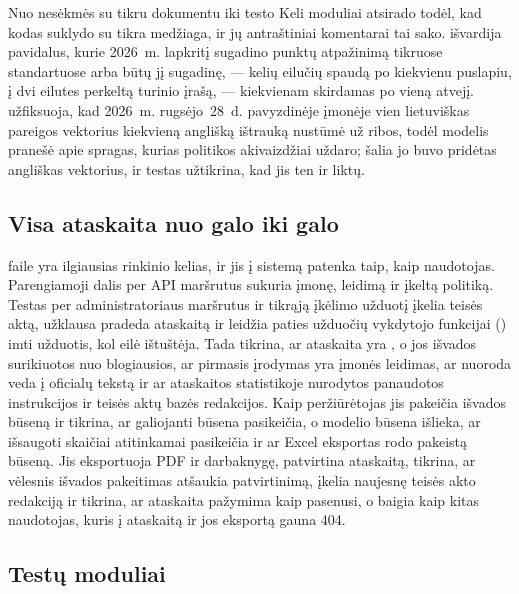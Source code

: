 \begin{lessonbox}{Nuo nesėkmės su tikru dokumentu iki testo}
Keli moduliai atsirado todėl, kad kodas suklydo su tikra medžiaga, ir jų antraštiniai
komentarai tai sako.  išvardija pavidalus, kurie 2026~m.
lapkritį sugadino punktų atpažinimą tikruose standartuose arba būtų jį sugadinę, --- kelių
eilučių spaudą po kiekvienu puslapiu, į dvi eilutes perkeltą turinio įrašą, --- kiekvienam skirdamas po vieną
atvejį.  užfiksuoja, kad 2026~m. rugsėjo~28~d.
pavyzdinėje įmonėje vien lietuviškas pareigos vektorius kiekvieną anglišką ištrauką nustūmė už
ribos, todėl modelis pranešė apie spragas, kurias politikos akivaizdžiai uždaro; šalia jo buvo
pridėtas angliškas vektorius, ir testas užtikrina, kad jis ten ir liktų.
\end{lessonbox}

\subsection{Visa ataskaita nuo galo iki galo}\label{sec:testing:api:report}

 faile  yra ilgiausias
rinkinio kelias, ir jis į sistemą patenka taip, kaip naudotojas. Parengiamoji dalis per API
maršrutus sukuria įmonę, leidimą ir įkeltą politiką. Testas per administratoriaus maršrutus ir
tikrąją įkėlimo užduotį įkelia teisės aktą, užklausa  pradeda
ataskaitą ir leidžia paties užduočių vykdytojo funkcijai () imti užduotis, kol
eilė ištuštėja. Tada tikrina, ar ataskaita yra , o jos išvados surikiuotos nuo
blogiausios, ar pirmasis įrodymas yra įmonės leidimas, ar nuoroda veda į oficialų tekstą ir ar
ataskaitos statistikoje nurodytos panaudotos instrukcijos ir teisės aktų bazės redakcijos.
Kaip peržiūrėtojas jis pakeičia išvados būseną ir tikrina, ar galiojanti būsena pasikeičia, o
modelio būsena išlieka, ar išsaugoti skaičiai atitinkamai pasikeičia ir ar Excel eksportas rodo
pakeistą būseną. Jis eksportuoja PDF ir darbaknygę, patvirtina ataskaitą, tikrina, ar vėlesnis
išvados pakeitimas atšaukia patvirtinimą, įkelia naujesnę teisės akto redakciją ir tikrina, ar
ataskaita pažymima kaip pasenusi, o baigia kaip kitas naudotojas, kuris į ataskaitą ir jos
eksportą gauna 404.

\subsection{Testų moduliai}\label{sec:testing:api:modules}

